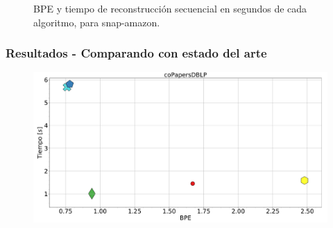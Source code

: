 \begin{frame}
\begin{figure}
\begin{minipage}{1\textwidth}
\begin{minipage}{0.15\textwidth}
    		\end{minipage}	
    	\end{minipage}

	\caption{BPE y tiempo de reconstrucción secuencial en segundos de cada algoritmo, para snap-amazon.}
\end{figure}

\end{frame}

\begin{frame}
\frametitle{Resultados - Comparando con estado del arte}

\begin{figure}
	\centering
	
    	\begin{minipage}{1\textwidth}
    		\centering
    		\begin{minipage}{0.8\textwidth}
    			\centering
    			\includegraphics[width=1\linewidth]{../img/bpeTimes/secuencial/coPapersDBLP.pdf}
    		\end{minipage}
    		\begin{minipage}{0.15\textwidth}
    			\centering

\end{minipage}
\end{minipage}
\end{figure}
\end{frame}
